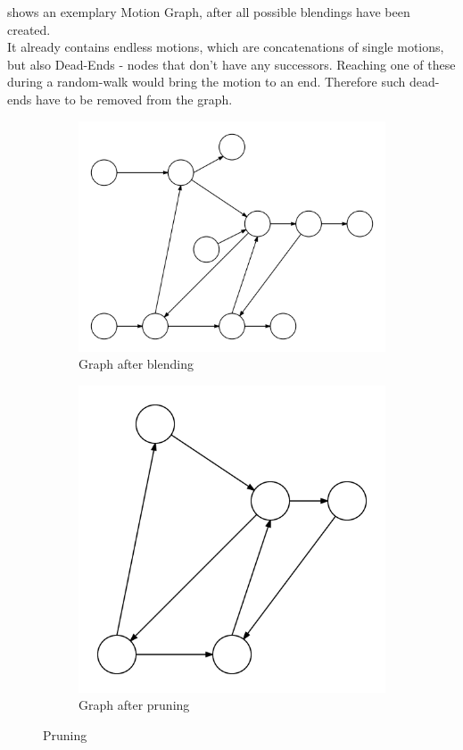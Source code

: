 \documentclass[a4paper,10pt,titlepage,bibliography=totocnumbered]{scrartcl}
\begin{document}
 shows an exemplary Motion Graph, after all possible blendings have been created.
\\
It already contains endless motions, which are concatenations of single motions, but also Dead-Ends - nodes that don't have any successors.
Reaching one of these during a random-walk would bring the motion to an end. Therefore such dead-ends have to be removed from the graph.


\begin{figure}[h]
\centering
\begin{subfigure}[b]{0.4\textwidth}
\includegraphics[width=\textwidth]{img/4_GraphAfterAllBlends.png}
	\caption{Graph after blending}
        \label{fig:fullyBlended}
\end{subfigure}
\begin{subfigure}[b]{0.4\textwidth}
\includegraphics[width=\textwidth]{img/5_GraphAfterPruning.png}
\caption{Graph after pruning}
\label{fig:pruned}
\end{subfigure}
\caption{Pruning}
\end{figure}
\end{document}
